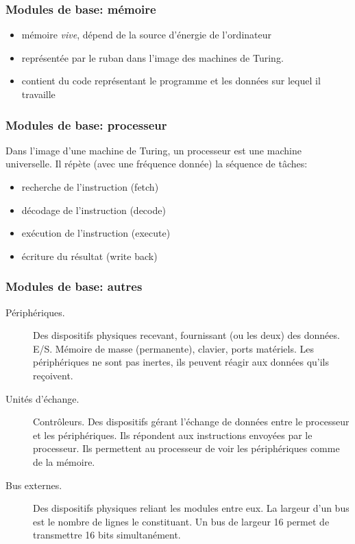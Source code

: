 \begin{frame}
\frametitle{Modules de base: mémoire}
\begin{itemize}
  \item mémoire \emph{vive}, dépend de la source d'énergie de l'ordinateur
  \item représentée par le ruban dans l'image des machines de Turing.
  \item contient du code représentant le programme et les données sur lequel il travaille
\end{itemize}
 
\end{frame}

\begin{frame}
\frametitle{Modules de base: processeur}
Dans l'image d'une machine de Turing, un processeur est une machine universelle.\newline
Il répète (avec une fréquence donnée) la séquence de tâches:
 \begin{itemize}
  \item recherche de l'instruction (fetch)
  \item décodage de l'instruction (decode)
  \item exécution de l'instruction (execute)
  \item écriture du résultat (write back)
 \end{itemize}
\end{frame}

\begin{frame}
\frametitle{Modules de base: autres}
\begin{description}
 \item[Périphériques.] Des dispositifs physiques recevant, fournissant (ou les deux) des données. E/S. Mémoire de masse (permanente), clavier, ports matériels. Les périphériques ne sont pas inertes, ils peuvent réagir aux données qu'ils reçoivent. 
 
 \item[Unités d'échange.]Contrôleurs. Des dispositifs gérant l'échange de données entre le processeur et les périphériques. Ils répondent aux instructions envoyées par le processeur. Ils permettent au processeur de voir les périphériques comme de la mémoire.
 
 \item[Bus externes.] Des dispositifs physiques reliant les modules entre eux. La largeur d'un bus est le nombre de lignes le constituant. Un bus de largeur 16 permet de transmettre 16 bits simultanément.
\end{description}
\end{frame}

